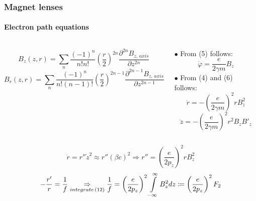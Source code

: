 \documentclass{beamer}
\begin{document}
  \begin{frame}
  \frametitle{Magnet lenses}
  \framesubtitle{Electron path equations}
  \begin{scriptsize}
\begin{columns}
  \begin{column}{0.6\textwidth}
  \begin{equation}
  B_{z}\left(z,r\right)=\underset{n}{\sum}\frac{\left(-1\right)^{n}}{n!n!}\left(\frac{r}{2}\right)^{2n}\frac{\partial^{2n}B_{z,\,axis}}{\partial z^{2n}}
  \end{equation}
  \begin{equation}
  B_{r}\left(z,r\right)=\underset{n}{\sum}\frac{\left(-1\right)^{n}}{n!\left(n-1\right)!}\left(\frac{r}{2}\right)^{2n-1}\frac{\partial^{2n-1}B_{z,\,axis}}{\partial z^{2n-1}}
  \end{equation}
  \end{column}
  \begin{column}{0.5\textwidth}
  $\bullet$ From (5) follows:
  \begin{equation}
  \dot{\varphi}=\frac{e}{2\gamma m}B_{z}
  \end{equation}
 $\bullet$ From (4) and (6) follows:
  \begin{equation}
  \ddot{r}=-\left(\frac{e}{2\gamma m}\right)^{2}rB_{z}^{2}
  \end{equation}
  \begin{equation}
  \ddot{z}=-\left(\frac{e}{2\gamma m}\right)^{2}r^{2}B_{z}B'_{z}
  \end{equation}
  \end{column}
 \end{columns}
  \begin{equation}
  \ddot{r}=r''\dot{z}^{2}\approx r''\left(\beta c\right)^{2}\Rightarrow r''=\left(\frac{e}{2p_{z}}\right)^{2}rB_{z}^{2}
  \end{equation}
  \begin{equation}
-\frac{r'}{r}=\frac{1}{f}\underset{integrate\,(12)}{\Rightarrow}\frac{1}{f}=\left(\frac{e}{2p_{z}}\right)^{2}\intop_{-\infty}^{\infty}B_{z}^{2}dz\coloneqq\left(\frac{e}{2p_{z}}\right)^{2}F_{2}
  \end{equation}
  \end{scriptsize}
  \end{frame}
\end{document}
